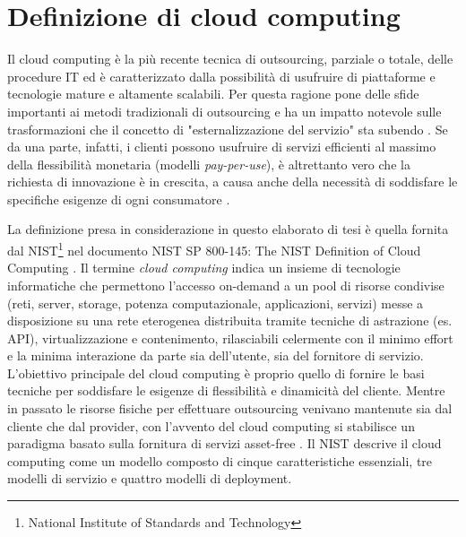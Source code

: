 \documentclass[../main.tex]{subfiles}
\begin{document}
\section{Definizione di cloud computing}
Il cloud computing è la più recente tecnica di outsourcing, parziale o totale, delle procedure IT ed è caratterizzato dalla possibilità di usufruire di piattaforme e tecnologie mature e altamente scalabili.
Per questa ragione pone delle sfide importanti ai metodi tradizionali di outsourcing e ha un impatto notevole sulle trasformazioni che il concetto di "esternalizzazione del servizio" sta subendo \cite{OutsourcingCloud}.
Se da una parte, infatti, i clienti possono usufruire di servizi efficienti al massimo della flessibilità monetaria (modelli \textit{pay-per-use}), è altrettanto vero che la richiesta di innovazione è in crescita, a causa anche della necessità di soddisfare le specifiche esigenze di ogni consumatore \cite{OutsourcingCloud2}.

La definizione presa in considerazione in questo elaborato di tesi è quella fornita dal NIST\footnote{National Institute of Standards and Technology} nel documento NIST SP 800-145: The NIST Definition of Cloud Computing \cite{NISTCloud}.
Il termine \textit{cloud computing} indica un insieme di tecnologie informatiche che permettono l'accesso on-demand a un pool di risorse condivise (reti, server, storage, potenza computazionale, applicazioni, servizi) messe a disposizione su una rete eterogenea distribuita tramite tecniche di astrazione (es. API), virtualizzazione e contenimento, rilasciabili celermente con il minimo effort e la minima interazione da parte sia dell'utente, sia del fornitore di servizio. %
L'obiettivo principale del cloud computing è proprio quello di fornire le basi tecniche per soddisfare le esigenze di flessibilità e dinamicità del cliente.
Mentre in passato le risorse fisiche per effettuare outsourcing venivano mantenute sia dal cliente che dal provider, con l'avvento del cloud computing si stabilisce un paradigma basato sulla fornitura di servizi asset-free \cite{OutsourcingCloud2}.
Il NIST \cite{NISTCloud} descrive il cloud computing come un modello composto di cinque caratteristiche essenziali, tre modelli di servizio e quattro modelli di deployment.
\end{document}
